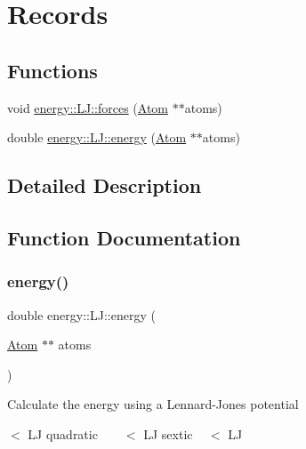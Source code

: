 \hypertarget{group___records}{}\section{Records}
\label{group___records}
\subsection*{Functions}
\begin{DoxyCompactItemize}
\item 
void \mbox{\hyperlink{group___records_ga964e5b1db9c2f1cfaf64663b2fa92e90}{energy\+::\+L\+J\+::forces}} (\mbox{\hyperlink{class_atom}{Atom}} $\ast$$\ast$atoms)
\item 
double \mbox{\hyperlink{group___records_ga100c4be2b148a0f7f68f6af3dac4135a}{energy\+::\+L\+J\+::energy}} (\mbox{\hyperlink{class_atom}{Atom}} $\ast$$\ast$atoms)
\end{DoxyCompactItemize}


\subsection{Detailed Description}


\subsection{Function Documentation}
\mbox{\label{group___records_ga100c4be2b148a0f7f68f6af3dac4135a}} 
\subsubsection{\texorpdfstring{energy()}{energy()}}
{\footnotesize\ttfamily double energy\+::\+L\+J\+::energy (\begin{DoxyParamCaption}\item[{\mbox{\hyperlink{class_atom}{Atom}} $\ast$$\ast$}]{atoms }\end{DoxyParamCaption})\hspace{0.3cm}{\ttfamily [inline]}}

Calculate the energy using a Lennard-\/\+Jones potential

$<$ LJ quadratic ~\newline
~\newline
 $<$ LJ sextic ~\newline
 $<$ LJ \mbox{\label{group___records_ga964e5b1db9c2f1cfaf64663b2fa92e90}} 
